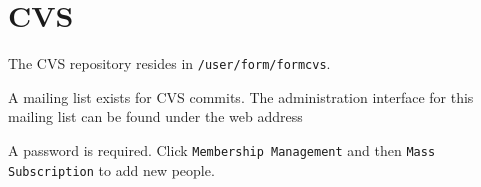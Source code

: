 \section{CVS}

The CVS repository resides in {\tt /user/form/formcvs}.


A mailing list exists for CVS commits. The administration interface for this mailing list can be
found under the web address


A password is required. Click {\tt Membership Management} and then {\tt Mass Subscription} to add
new people.

